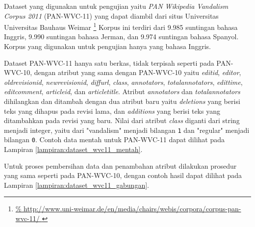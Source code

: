 Dataset yang digunakan untuk pengujian yaitu \textit{PAN Wikipedia Vandalism
Corpus 2011} (PAN-WVC-11)
\parencite{potthast:2010b}
yang dapat diambil dari situs Universitas Universitas Bauhaus Weimar
\footnote{%
	\RaggedRight\url{%
http://www.uni-weimar.de/en/media/chairs/webis/corpora/corpus-pan-wvc-11/
	}
}
Korpus ini terdiri dari 9.985 suntingan bahasa Inggris, 9.990 suntingan bahasa
Jerman, dan 9.974 suntingan bahasa Spanyol.
Korpus yang digunakan untuk pengujian hanya yang bahasa Inggris.

Dataset PAN-WVC-11 hanya satu berkas, tidak terpisah seperti pada PAN-WVC-10,
dengan atribut yang sama dengan PAN-WVC-10 yaitu
\textit{editid},
\textit{editor},
\textit{oldrevisionid},
\textit{newrevisionid},
\textit{diffurl},
\textit{class},
\textit{annotators},
\textit{totalannotators},
\textit{edittime},
\textit{editcomment},
\textit{articleid}, dan
\textit{articletitle}.
Atribut \textit{annotators} dan \textit{totalannotators} dihilangkan dan
ditambah dengan dua atribut baru yaitu \textit{deletions} yang berisi teks yang
dihapus pada revisi lama, dan \textit{additions} yang berisi teks yang
ditambahkan pada revisi yang baru.
Nilai dari atribut \textit{class} diganti dari string menjadi integer, yaitu
dari "vandalism" menjadi bilangan \texttt{1}
dan "regular" menjadi bilangan \texttt{0}.
Contoh data mentah untuk PAN-WVC-11 dapat dilihat pada Lampiran
\ref{lampiran:dataset_wvc11_mentah}.

Untuk proses pembersihan data dan penambahan atribut dilakukan prosedur yang
sama seperti pada PAN-WVC-10, dengan contoh hasil dapat dilihat pada Lampiran
\ref{lampiran:dataset_wvc11_gabungan}.
